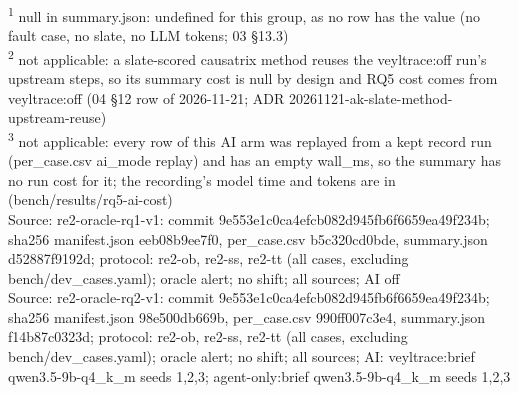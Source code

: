 \begin{table}[t]
\begin{tabular}{lllllllllllll}
\hline
\end{tabular}
\par\smallskip\footnotesize
\textsuperscript{1} null in summary.json: undefined for this group, as no row has the value (no fault case, no slate, no LLM tokens; 03 \S{}13.3)\\
\textsuperscript{2} not applicable: a slate-scored causatrix method reuses the veyltrace:off run's upstream steps, so its summary cost is null by design and RQ5 cost comes from veyltrace:off (04 \S{}12 row of 2026-11-21; ADR 20261121-ak-slate-method-upstream-reuse)\\
\textsuperscript{3} not applicable: every row of this AI arm was replayed from a kept record run (per\_case.csv ai\_mode replay) and has an empty wall\_ms, so the summary has no run cost for it; the recording's model time and tokens are in  (bench/results/rq5-ai-cost)\\
Source: re2-oracle-rq1-v1: commit 9e553e1c0ca4efcb082d945fb6f6659ea49f234b; sha256 manifest.json eeb08b9ee7f0, per\_case.csv b5c320cd0bde, summary.json d52887f9192d; protocol: re2-ob, re2-ss, re2-tt (all cases, excluding bench/dev\_cases.yaml); oracle alert; no shift; all sources; AI off\\
Source: re2-oracle-rq2-v1: commit 9e553e1c0ca4efcb082d945fb6f6659ea49f234b; sha256 manifest.json 98e500db669b, per\_case.csv 990ff007c3e4, summary.json f14b87c0323d; protocol: re2-ob, re2-ss, re2-tt (all cases, excluding bench/dev\_cases.yaml); oracle alert; no shift; all sources; AI: veyltrace:brief qwen3.5-9b-q4\_k\_m seeds 1,2,3; agent-only:brief qwen3.5-9b-q4\_k\_m seeds 1,2,3\\
\end{table}
